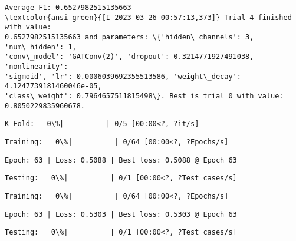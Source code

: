 \documentclass[11pt]{article}
\begin{document}
    
    \begin{Verbatim}[commandchars=\\\{\}]
Average F1: 0.6527982515135663
\textcolor{ansi-green}{[I 2023-03-26 00:57:13,373]} Trial 4 finished with value:
0.6527982515135663 and parameters: \{'hidden\_channels': 3, 'num\_hidden': 1,
'conv\_model': 'GATConv(2)', 'dropout': 0.3214771927491038, 'nonlinearity':
'sigmoid', 'lr': 0.0006039692355513586, 'weight\_decay': 4.1247739181460046e-05,
'class\_weight': 0.7964657511815498\}. Best is trial 0 with value:
0.8050229835960678.
    \end{Verbatim}

    
    \begin{Verbatim}[commandchars=\\\{\}]
K-Fold:   0\%|          | 0/5 [00:00<?, ?it/s]
    \end{Verbatim}

    
    
    \begin{Verbatim}[commandchars=\\\{\}]
Training:   0\%|          | 0/64 [00:00<?, ?Epochs/s]
    \end{Verbatim}

    
    \begin{Verbatim}[commandchars=\\\{\}]
Epoch: 63 | Loss: 0.5088 | Best loss: 0.5088 @ Epoch 63
    \end{Verbatim}

    
    \begin{Verbatim}[commandchars=\\\{\}]
Testing:   0\%|          | 0/1 [00:00<?, ?Test cases/s]
    \end{Verbatim}

    
    
    \begin{Verbatim}[commandchars=\\\{\}]
Training:   0\%|          | 0/64 [00:00<?, ?Epochs/s]
    \end{Verbatim}

    
    \begin{Verbatim}[commandchars=\\\{\}]
Epoch: 63 | Loss: 0.5303 | Best loss: 0.5303 @ Epoch 63
    \end{Verbatim}

    
    \begin{Verbatim}[commandchars=\\\{\}]
Testing:   0\%|          | 0/1 [00:00<?, ?Test cases/s]
    \end{Verbatim}
\end{document}

